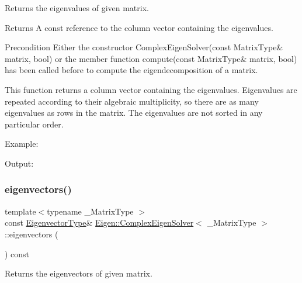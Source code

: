 Returns the eigenvalues of given matrix. 

\begin{DoxyReturn}{Returns}
A const reference to the column vector containing the eigenvalues.
\end{DoxyReturn}
\begin{DoxyPrecond}{Precondition}
Either the constructor Complex\+Eigen\+Solver(const Matrix\+Type\& matrix, bool) or the member function compute(const Matrix\+Type\& matrix, bool) has been called before to compute the eigendecomposition of a matrix.
\end{DoxyPrecond}
This function returns a column vector containing the eigenvalues. Eigenvalues are repeated according to their algebraic multiplicity, so there are as many eigenvalues as rows in the matrix. The eigenvalues are not sorted in any particular order.

Example\+: 
\begin{DoxyCodeInclude}{0}
\end{DoxyCodeInclude}
 Output\+: 
\begin{DoxyVerbInclude}
\end{DoxyVerbInclude}
 \mbox{\label{class_eigen_1_1_complex_eigen_solver_a3aa5e27800349990778da8fa532c1270}} 
\subsubsection{\texorpdfstring{eigenvectors()}{eigenvectors()}}
{\footnotesize\ttfamily template$<$typename \+\_\+\+Matrix\+Type $>$ \\
const \mbox{\hyperlink{class_eigen_1_1_complex_eigen_solver_a67cd4d20590abfd86b2639c4c8ea3dd6}{Eigenvector\+Type}}\& \mbox{\hyperlink{class_eigen_1_1_complex_eigen_solver}{Eigen\+::\+Complex\+Eigen\+Solver}}$<$ \+\_\+\+Matrix\+Type $>$\+::eigenvectors (\begin{DoxyParamCaption}{ }\end{DoxyParamCaption}) const\hspace{0.3cm}{\ttfamily [inline]}}



Returns the eigenvectors of given matrix. 

